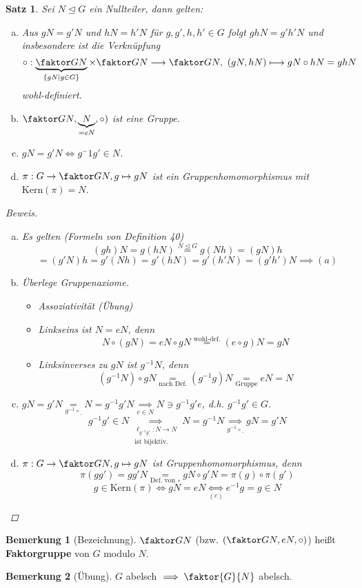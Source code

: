 \documentclass[a4paper]{article}
\theoremstyle{plain}
\newtheorem{satz}[thm]{Satz}
\theoremstyle{definition}
\newtheorem*{bem*}{Bemerkung}
\begin{document}
\begin{satz}
  Sei $N \trianglelefteq G$ ein Nullteiler, dann gelten:
  \begin{enumerate}[(a)]
    \item Aus $gN = g'N$ und $hN = h'N$ für $g, g', h, h' \in G$ folgt $ghN = g'h'N$ und insbesondere ist die Verknüpfung $$\circ : \underbrace{\faktor GN}_{\{gN \mid g \in G\}} \times \faktor GN \longrightarrow \faktor GN,\  (gN, hN) \longmapsto gN \circ hN = ghN$$
          wohl-definiert.
    \item $\faktor GN, \underbrace{N}_{=eN}, \circ)$ ist eine Gruppe.
    \item $gN = g'N \iff g^-1g' \in N$.
    \item $\pi : G \to \faktor GN, g \mapsto gN$ ist ein Gruppenhomomorphismus mit $\mathrm{Kern}(\pi) = N$.
  \end{enumerate}
\begin{proof}[Beweis]
\begin{enumerate}[(a)]
  \item Es gelten (Formeln von Definition 40)
        $$(gh)N = g(hN) \overset{N \trianglelefteq G}= g(Nh) = (gN)h$$
        $$= (g'N)h = g'(Nh) = g'(hN) = g'(h'N) = (g'h')N \implies (a)$$
  \item Überlege Gruppenaxiome.
\begin{itemize}
  \item Assoziativität (Übung)
  \item Linkseins ist $N = eN$, denn
        $$N \circ(gN) = eN\circ gN \overset{\text{wohl-def.}} = (e \circ g)N = gN$$
  \item Linksinverses zu $gN$ ist $g^{-1}N$, denn
        $$(g^{-1}N)\circ gN \underset{\text{nach Def.}}= (g^{-1}g)N \underset{\text{Gruppe}}= eN = N$$
\end{itemize}
  \item  $gN = g'N \underset{g^{-1}\circ \underline{\ }}= N = g^{-1}g'N \underset{e \in N}\implies N \ni g^{-1}g'e$, d.h. $g^{-1}g' \in G$.
        $$g^{-1}g' \in N \underset{\substack{\ell_{g^{-1}g'} : N \to N\\ \text{ist bijektiv.}}}\implies N = g^{-1}N \underset{g^{-1}\circ \underline{\ }}\implies gN= g'N$$
  \item $\pi : G \to \faktor GN, g \mapsto gN$ ist Gruppenhomomorphismus, denn $$\pi(gg') = gg'N \underset{\text{Def. von } \circ} = gN \circ g'N = \pi(g)\circ \pi(g')$$
        $$g \in \mathrm{Kern}(\pi) \iff gN = eN \underset{(c)}\iff e^{-1}g = g \in N$$
\end{enumerate}
\end{proof}
\end{satz}
\begin{bem*}[Bezeichnung] $\faktor GN$ (bzw. $(\faktor GN, eN, \circ)$) heißt \textbf{Faktorgruppe} von $G$ modulo $N$.
\end{bem*}
\begin{bem*}[Übung]
$G$ abelsch $\implies \faktor{G}{N}$ abelsch.
\end{bem*}
\end{document}
